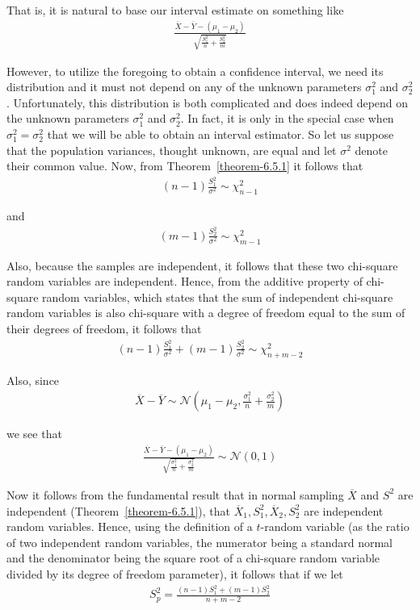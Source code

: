 \documentclass[12pt]{article}
\begin{document}
That is, it is natural to base our interval estimate on something like
\begin{eqnarray*}
  \frac {\overline{X} - \overline{Y} - (\mu_1 - \mu_2)}
  {\sqrt {\frac{S_1^2}{n} + \frac{S_2^2}{m}}}
\end{eqnarray*}

However, to utilize the foregoing to obtain a confidence interval, we need its distribution and it must not depend on any of the unknown parameters $\sigma_1^2$ and $\sigma_2^2$. Unfortunately, this distribution is both complicated and does indeed depend on the unknown parameters $\sigma_1^2$ and $\sigma_2^2$. In fact, it is only in the special case when $\sigma_1^2 = \sigma_2^2$ that we will be able to obtain an interval estimator. So let us suppose that the population variances, thought unknown, are equal and let $\sigma^2$ denote their common value. Now, from Theorem~\ref{theorem-6.5.1} it follows that
\begin{eqnarray*}
  (n-1) \frac {S_1^2}{\sigma^2} \sim \chi_{n-1}^2
\end{eqnarray*}

and
\begin{eqnarray*}
  (m-1) \frac {S_2^2}{\sigma^2} \sim \chi_{m-1}^2
\end{eqnarray*}

Also, because the samples are independent, it follows that these two chi-square random variables are independent. Hence, from the additive property of chi-square random variables, which states that the sum of independent chi-square random variables is also chi-square with a degree of freedom equal to the sum of their degrees of freedom, it follows that
\begin{eqnarray*}
    (n-1) \frac {S_1^2}{\sigma^2} + (m-1) \frac {S_2^2}{\sigma^2}
    \sim \chi_{n+m-2}^2
\end{eqnarray*}

Also, since
\begin{eqnarray*}
  \overline{X} - \overline{Y} \sim \mathcal{N} (\mu_1 - \mu_2,
  \frac{\sigma_1^2}{n} + \frac{\sigma_2^2}{m})
\end{eqnarray*}

we see that
\begin{eqnarray*}
  \frac {\overline{X} - \overline{Y} - (\mu_1 - \mu_2)}
  {\sqrt {\frac{\sigma_1^2}{n} + \frac{\sigma_2^2}{m}}}
  \sim \mathcal{N} (0,1)
\end{eqnarray*}

Now it follows from the fundamental result that in normal sampling $\overline{X}$ and $S^2$ are independent (Theorem~\ref{theorem-6.5.1}), that $\overline{X}_1, S_1^2, \overline{X}_2, S_2^2$ are independent random variables. Hence, using the definition of a $t$-random variable (as the ratio of two independent random variables, the numerator being a standard normal and the denominator being the square root of a chi-square random variable divided by its degree of freedom parameter), it follows that if we let
\begin{eqnarray*}
  S_p^2 = \frac {(n-1)S_1^2 + (m-1)S_2^2}{n+m-2}
\end{eqnarray*}
\end{document}
